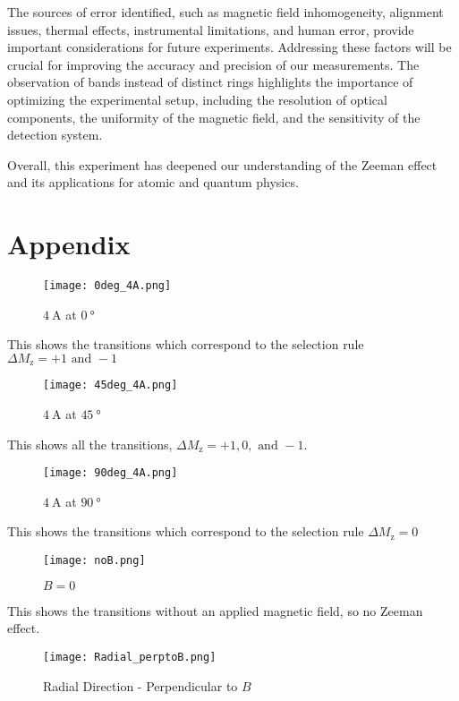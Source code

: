 \documentclass[11pt]{article}
\begin{document}
	The sources of error identified, such as magnetic field inhomogeneity, alignment issues, thermal effects, instrumental limitations, and human error, provide important considerations for future experiments. Addressing these factors will be crucial for improving the accuracy and precision of our measurements. The observation of bands instead of distinct rings highlights the importance of optimizing the experimental setup, including the resolution of optical components, the uniformity of the magnetic field, and the sensitivity of the detection system.
	
	Overall, this experiment has deepened our understanding of the Zeeman effect and its applications for atomic and quantum physics.

\clearpage

	\section{Appendix}
	
	\begin{figure}[htbp]
		\centering
		\caption{$\qty{4}{\ampere}$ at $\qty{0}{\degree}$}
		\texttt{[image: 0deg\_4A.png]}
	\end{figure}
	This shows the transitions which correspond to the selection rule $\Delta M_\mathrm{z} = +1 \text{ and } -1$
	
	\begin{figure}[htbp]
		\centering
		\caption{$\qty{4}{\ampere}$ at $\qty{45}{\degree}$}
		\texttt{[image: 45deg\_4A.png]}
	\end{figure}
	This shows all the transitions, $\Delta M_\mathrm{z} = +1, 0, \text{ and } -1$.
	
\clearpage

	\begin{figure}[htbp]
		\centering
		\caption{$\qty{4}{\ampere}$ at $\qty{90}{\degree}$}
		\texttt{[image: 90deg\_4A.png]}
	\end{figure}
	This shows the transitions which correspond to the selection rule $\Delta M_\mathrm{z} = 0$
	
	\begin{figure}[htbp]
		\centering
		\caption{$B=0$}
		\texttt{[image: noB.png]}
	\end{figure}
	This shows the transitions without an applied magnetic field, so no Zeeman effect.
	
	\begin{figure}[htbp]
		\centering
		\caption{Radial Direction - Perpendicular to $B$}
		\texttt{[image: Radial\_perptoB.png]}
	\end{figure}
	
\end{document}
